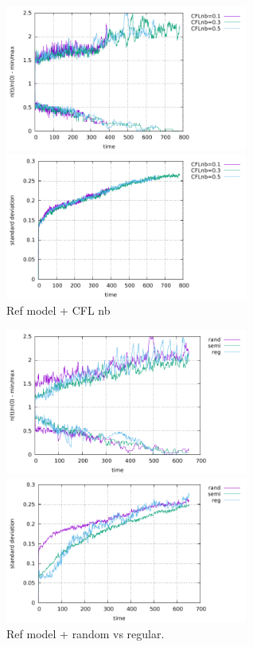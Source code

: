 \begin{center}
\includegraphics[width=8cm]{python_codes/fieldstone_30/results_dh/markercount_cflnb}
\includegraphics[width=8cm]{python_codes/fieldstone_30/results_dh/stdev_cflnb}\\
{\captionfont Ref model + CFL nb}
\end{center}

\begin{center}
\includegraphics[width=8cm]{python_codes/fieldstone_30/results_dh/markercount_reg}
\includegraphics[width=8cm]{python_codes/fieldstone_30/results_dh/stdev_reg}\\
{\captionfont Ref model + random vs regular.} 
\end{center}

